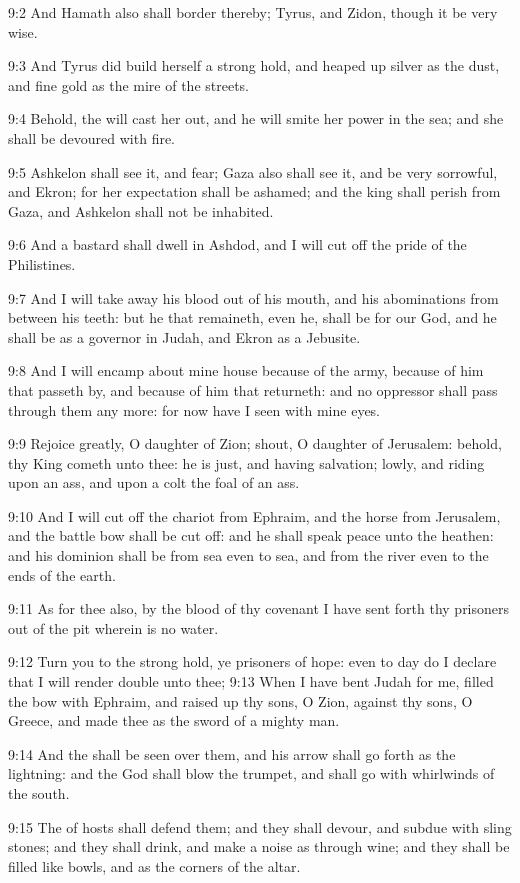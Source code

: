 9:2 And Hamath also shall border thereby; Tyrus, and Zidon, though it be very wise.

9:3 And Tyrus did build herself a strong hold, and heaped up silver as the dust, and fine gold as the mire of the streets.

9:4 Behold, the \LORD will cast her out, and he will smite her power in the sea; and she shall be devoured with fire.

9:5 Ashkelon shall see it, and fear; Gaza also shall see it, and be very sorrowful, and Ekron; for her expectation shall be ashamed; and the king shall perish from Gaza, and Ashkelon shall not be inhabited.

9:6 And a bastard shall dwell in Ashdod, and I will cut off the pride of the Philistines.

9:7 And I will take away his blood out of his mouth, and his abominations from between his teeth: but he that remaineth, even he, shall be for our God, and he shall be as a governor in Judah, and Ekron as a Jebusite.

9:8 And I will encamp about mine house because of the army, because of him that passeth by, and because of him that returneth: and no oppressor shall pass through them any more: for now have I seen with mine eyes.

9:9 Rejoice greatly, O daughter of Zion; shout, O daughter of Jerusalem: behold, thy King cometh unto thee: he is just, and having salvation; lowly, and riding upon an ass, and upon a colt the foal of an ass.

9:10 And I will cut off the chariot from Ephraim, and the horse from Jerusalem, and the battle bow shall be cut off: and he shall speak peace unto the heathen: and his dominion shall be from sea even to sea, and from the river even to the ends of the earth.

9:11 As for thee also, by the blood of thy covenant I have sent forth thy prisoners out of the pit wherein is no water.

9:12 Turn you to the strong hold, ye prisoners of hope: even to day do I declare that I will render double unto thee; 9:13 When I have bent Judah for me, filled the bow with Ephraim, and raised up thy sons, O Zion, against thy sons, O Greece, and made thee as the sword of a mighty man.

9:14 And the \LORD shall be seen over them, and his arrow shall go forth as the lightning: and the \LORD God shall blow the trumpet, and shall go with whirlwinds of the south.

9:15 The \LORD of hosts shall defend them; and they shall devour, and subdue with sling stones; and they shall drink, and make a noise as through wine; and they shall be filled like bowls, and as the corners of the altar.

